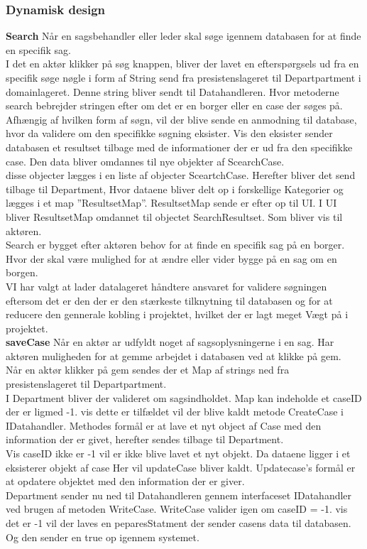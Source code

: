\subsubsection{Dynamisk design}
\textbf{Search}
Når en sagsbehandler eller leder skal søge igennem databasen for at finde en specifik sag. \\
I det en aktør klikker på søg knappen, bliver der lavet en efterspørgsels ud fra en specifik søge nøgle i form af String send fra presistenslageret til Departpartment i domainlageret. Denne string bliver sendt til Datahandleren. Hvor metoderne search bebrejder stringen efter om det er en borger eller en case der søges på. Afhængig af hvilken form af søgn, vil der blive sende en anmodning til database, hvor da validere om den specifikke søgning eksister. Vis den eksister sender databasen et resultset tilbage med de informationer der er ud fra den specifikke case. Den data bliver omdannes til nye objekter af ScearchCase.\\
disse objecter lægges i en liste af objecter SceartchCase. Herefter bliver det send tilbage til Department, Hvor dataene bliver delt op i forskellige Kategorier og lægges i et map ”ResultsetMap”. ResultsetMap sende er efter op til UI. I UI bliver ResultsetMap omdannet til objectet SearchResultset. Som bliver vis til aktøren. \\
Search er bygget efter aktøren behov for at finde en specifik sag på en borger. Hvor der skal være mulighed for at ændre eller vider bygge på en sag om en borgen. \\
VI har valgt at lader datalageret håndtere ansvaret for validere søgningen eftersom det er den der er den stærkeste tilknytning til databasen og for at reducere den gennerale kobling i projektet, hvilket der er lagt meget Vægt på i projektet.\\
\textbf{saveCase}
Når en aktør ar udfyldt noget af sagsoplysningerne i en sag. Har aktøren muligheden for at gemme arbejdet i databasen ved at klikke på gem. \\
Når en aktør klikker på gem sendes der et Map af strings ned fra presistenslageret til Departpartment.\\
I Department bliver der valideret om sagsindholdet. Map kan indeholde et caseID der er ligmed -1. vis dette er tilfældet vil der blive kaldt metode CreateCase i IDatahandler. Methodes formål er at lave et nyt object af Case med den information der er givet, herefter sendes tilbage til Department. \\
Vis caseID ikke er -1 vil er ikke blive lavet et nyt objekt. Da dataene ligger i et eksisterer objekt af case Her vil updateCase bliver kaldt. Updatecase’s formål er at opdatere objektet med den information der er giver. \\
Department sender nu ned til Datahandleren gennem interfaceset IDatahandler ved brugen af metoden WriteCase. WriteCase valider igen om caseID = -1. vis det er -1 vil der laves en peparesStatment der sender casens data til databasen. Og den sender en true op igennem systemet.
